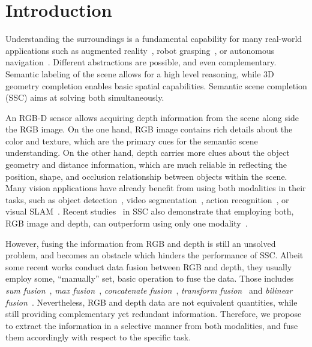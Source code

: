\documentclass[10pt,twocolumn,letterpaper]{article}
\begin{document}
\section{Introduction}

Understanding the surroundings is a fundamental capability for many real-world applications such as augmented reality~\cite{chen2017semantic}, robot grasping~\cite{varley2017shape}, or autonomous navigation~\cite{doan2019scalable}.
Different abstractions are possible, and even complementary. 
Semantic labeling of the scene allows for a high level reasoning, while 3D geometry completion enables basic spatial capabilities.
Semantic scene completion (SSC) aims at solving both simultaneously.

An RGB-D sensor allows acquiring depth information from the scene along side the RGB image. 
On the one hand, RGB image contains rich details about the color and texture, which are the primary cues for the semantic scene understanding. 
On the other hand, depth carries more clues about the object geometry and distance information, which are much reliable in reflecting the position, shape, and occlusion relationship between objects within the scene.
Many vision applications have already benefit from using both modalities in their tasks, such as object detection~\cite{gupta2014learning,chen2017multi}, video segmentation~\cite{fu2017object,sultana2018unsupervised,emre2017semantic}, action recognition~\cite{ijjina2017human,hu2018deep, zhang2018rgb}, 
or visual SLAM~\cite{kerl2013dense,whelan2013robust,lu2015robust}.
Recent studies~\cite{Garbade2018_twoStream,li2019rgbd} in SSC also demonstrate that employing both, RGB image and depth, can outperform using only one modality~\cite{song2017_SSCNet}.

However, fusing the information from RGB and depth is still an unsolved problem, and becomes an
obstacle which hinders the performance of SSC.
Albeit some recent works conduct data fusion between RGB and depth, they usually employ some, ``manually'' set, basic operation to fuse the data. 
Those includes \textit{sum fusion}~\cite{li2019rgbd,hazirbas2016fusenet}, \textit{max fusion}~\cite{kang2014convolutional}, \textit{concatenate fusion}~\cite{couprie2013indoor,guo2018semantic}, 
\textit{transform fusion}~\cite{wang2016learning} and \textit{bilinear fusion}~\cite{lin2015bilinear}. Nevertheless, RGB and depth data are not equivalent quantities, while still providing complementary yet redundant information. Therefore, we propose to extract the information in a selective manner from both modalities, and fuse them accordingly with respect to the specific task.
\end{document}
